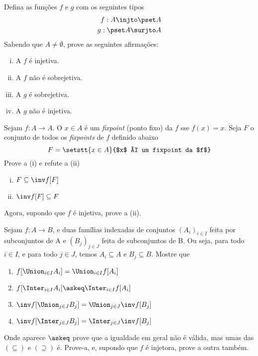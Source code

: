 \begin{exercise}
    Defina as funções $f$ e $g$ com os seguintes tipos
    \begin{align*}
        f : A \injto \pset A \\
        g : \pset A \surjto A
    \end{align*}
    Sabendo que $A \not= \emptyset$, prove as seguintes afirmações:
    \begin{enumerate}[(i)]
        \item A $f$ é injetiva.
        \item A $f$ não é sobrejetiva.
        \item A $g$ é sobrejetiva.
        \item A $g$ não é injetiva.
    \end{enumerate}
\end{exercise}

\begin{exercise}
    Sejam $f: A \to A$. O $x \in A$ é um \emph{fixpoint} (ponto fixo) da $f$ sse
    $f(x) = x$. Seja $F$ o conjunto de todos os \emph{fixpoints} de $f$ definido
    abaixo
    $$
    F = \setstt{x \in A}{$x$ é um fixpoint da $f$}
    $$
    Prove a (i) e refute a (ii)
    \begin{enumerate}[(i)]
        \item $F \subseteq \inv f[F]$
        \item $\inv f[F] \subseteq F$
    \end{enumerate}
    Agora, supondo que $f$ é injetiva, prove a (ii).
\end{exercise}

\begin{exercise}
    Sejam $f: A \to B$, e duas famílias indexadas de conjuntos $(A_i)_{i \in I}$
    feita por subconjuntos de A e $(B_j)_{j \in J}$ feita de subconjuntos de B.
    Ou seja, para todo $i \in I$, e para todo $j \in J$, temos $A_i \subseteq A$
    e $B_j \subseteq B$. Mostre que
    \begin{enumerate}[(1)]
        \item $f[\Union_{i \in I} A_i] = \Union_{i \in I} f[A_i]$
        \item $f[\Inter_{i \in I} A_i] \askeq \Inter_{i \in I} f[A_i]$
        \item $\inv f[\Union_{j \in J} B_j] = \Union_{j \in J} \inv f[B_j]$
        \item $\inv f[\Inter_{j \in J} B_j] = \Inter_{j \in J} \inv f[B_j]$
    \end{enumerate}
    Onde aparece $\askeq$ prove que a igualdade em geral não é válida, mas umas
    das $(\subseteq)$ e $(\supseteq)$ é. Prove-a, e, supondo que $f$ é
    injetora, prove a outra também.
\end{exercise}
